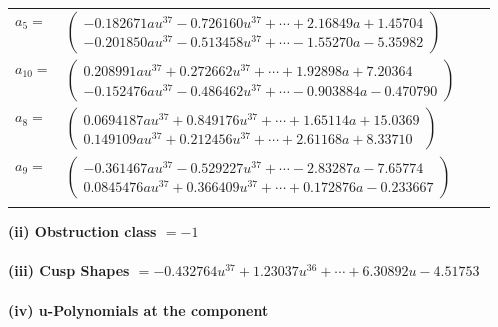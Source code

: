 \documentclass[1p]{elsarticle_modified}
\theoremstyle{definition}
\begin{document}
\begin{tabular}{m{7pt} m{180pt} m{7pt} m{180pt} }
\flushright $a_{5}=$&$\begin{pmatrix}-0.182671 a u^{37}-0.726160 u^{37}+\cdots+2.16849 a+1.45704\\-0.201850 a u^{37}-0.513458 u^{37}+\cdots-1.55270 a-5.35982\end{pmatrix}$ \\
\flushright $a_{10}=$&$\begin{pmatrix}0.208991 a u^{37}+0.272662 u^{37}+\cdots+1.92898 a+7.20364\\-0.152476 a u^{37}-0.486462 u^{37}+\cdots-0.903884 a-0.470790\end{pmatrix}$ \\
\flushright $a_{8}=$&$\begin{pmatrix}0.0694187 a u^{37}+0.849176 u^{37}+\cdots+1.65114 a+15.0369\\0.149109 a u^{37}+0.212456 u^{37}+\cdots+2.61168 a+8.33710\end{pmatrix}$ \\
\flushright $a_{9}=$&$\begin{pmatrix}-0.361467 a u^{37}-0.529227 u^{37}+\cdots-2.83287 a-7.65774\\0.0845476 a u^{37}+0.366409 u^{37}+\cdots+0.172876 a-0.233667\end{pmatrix}$\\&\end{tabular}
\flushleft \textbf{(ii) Obstruction class $= -1$}\\~\\
\flushleft \textbf{(iii) Cusp Shapes $= -0.432764 u^{37}+1.23037 u^{36}+\cdots+6.30892 u-4.51753$}\\~\\
\newpage\renewcommand{\arraystretch}{1}
\flushleft \textbf{(iv) u-Polynomials at the component}\newline \\
\end{document}

